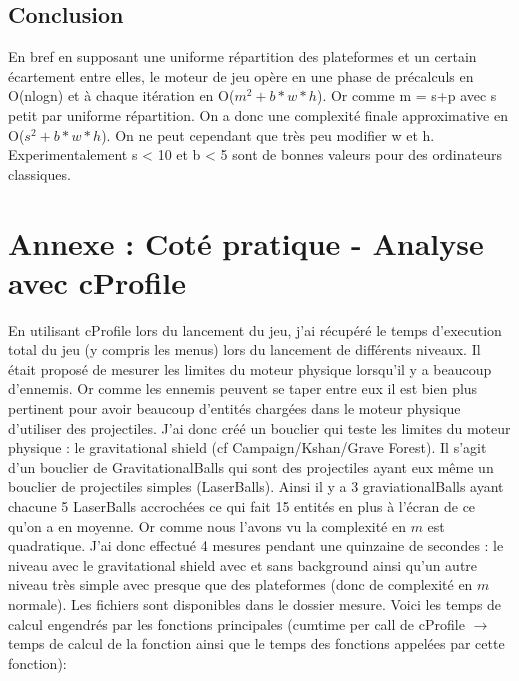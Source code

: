 \documentclass[11pt]{article}
\begin{document}
\subsection{Conclusion}
En bref en supposant une uniforme répartition des plateformes et un certain écartement entre elles, le moteur de jeu opère en une phase de précalculs en O(nlogn) et à chaque itération en O($m^2+b*w*h$). Or comme m = s+p avec s petit par uniforme répartition. On a donc une complexité finale approximative en O($s^2+b*w*h$). On ne peut cependant que très peu modifier w et h. Experimentalement s < 10 et b < 5 sont de bonnes valeurs pour des ordinateurs classiques.


\section{Annexe : Coté pratique - Analyse avec cProfile}
En utilisant cProfile lors du lancement du jeu, j'ai récupéré le temps d'execution total du jeu (y compris les menus) lors du lancement de différents niveaux. Il était proposé de mesurer les limites du moteur physique lorsqu'il y a beaucoup d'ennemis. Or comme les ennemis peuvent se taper entre eux il est bien plus pertinent pour avoir beaucoup d'entités chargées dans le moteur physique d'utiliser des projectiles. J'ai donc créé un bouclier qui teste les limites du moteur physique : le gravitational shield (cf Campaign/Kshan/Grave Forest). Il s'agit d'un bouclier de GravitationalBalls qui sont des projectiles ayant eux même un bouclier de projectiles simples (LaserBalls). Ainsi il y a 3 graviationalBalls ayant chacune 5 LaserBalls accrochées ce qui fait 15 entités en plus à l'écran de ce qu'on a en moyenne. Or comme nous l'avons vu la complexité en $m$ est quadratique. J'ai donc effectué 4 mesures pendant une quinzaine de secondes : le niveau avec le gravitational shield avec et sans background ainsi qu'un autre niveau très simple avec presque que des plateformes (donc de complexité en $m$ normale). Les fichiers sont disponibles dans le dossier mesure. Voici les temps de calcul engendrés par les fonctions principales (cumtime per call de cProfile $\rightarrow$ temps de calcul de la fonction ainsi que le temps des fonctions appelées par cette fonction): \\
\end{document}
